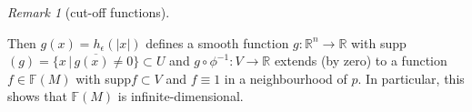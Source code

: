 \documentclass[a4paper,11pt,titlepage]{article}
\numberwithin{equation}{section}
\theoremstyle{definition}
\theoremstyle{remark}
\newtheorem{remark}[theorem]{Remark}
\newcommand{\rfield}{\mathbb{R}}
\begin{document}
\begin{remark}[cut-off functions]
\begin{figure}[H]
\end{figure}
  Then $g(x) = h_{\epsilon}(|x|)$ defines a smooth function $g \colon \rfield^n \rightarrow \rfield$ with supp$(g) = \overline{\{ x \, | \, g(x) \not =  0\}} \subset U$ and $g \circ \phi^{-1} \colon V \rightarrow \rfield$ extends (by zero) to a function $f \in \mathbb{F}(M)$ with supp$f \subset V$ and $f \equiv 1$ in a neighbourhood of $p$. In particular, this shows that $\mathbb{F}(M)$ is infinite-dimensional.


\end{remark}
\end{document}
